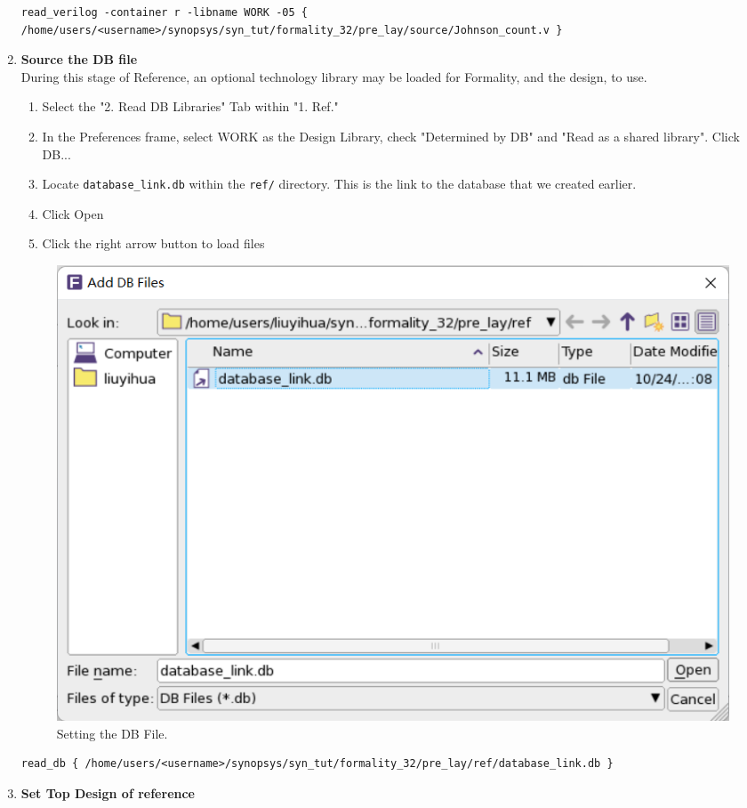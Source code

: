 \documentclass[a4paper,12pt,twoside]{article}
\begin{document}
\begin{enumerate}
\begin{verbatim}
read_verilog -container r -libname WORK -05 { /home/users/<username>/synopsys/syn_tut/formality_32/pre_lay/source/Johnson_count.v } 
    \end{verbatim}
    \item \textbf{Source the DB file}\\
    During this stage of Reference, an optional technology library may be loaded for Formality, and the design, to use.
    \begin{enumerate}
        \item Select the "2. Read DB Libraries" Tab within "1. Ref."
        \item In the Preferences frame, select WORK as the Design Library, check "Determined by DB" and "Read as a shared library". Click DB...
        \item Locate \texttt{database\_link.db} within the \texttt{ref/} directory. This is the link to the database that we created earlier.
        \item Click Open
        \item Click the right arrow button to load files
    \end{enumerate}
    \begin{figure}[H]
        \centering
        \includegraphics[width=\textwidth]{images/43.png}
        \caption{Setting the DB File.}
    \end{figure}
    \begin{verbatim}
read_db { /home/users/<username>/synopsys/syn_tut/formality_32/pre_lay/ref/database_link.db } 
    \end{verbatim}
    \item \textbf{Set Top Design of reference}\\

\end{enumerate}
\end{document}
